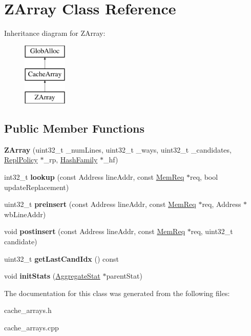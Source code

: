 \hypertarget{classZArray}{\section{Z\-Array Class Reference}
\label{classZArray}
}
Inheritance diagram for Z\-Array\-:\begin{figure}[H]
\begin{center}
\leavevmode
\includegraphics[height=3.000000cm]{classZArray}
\end{center}
\end{figure}
\subsection*{Public Member Functions}
\begin{DoxyCompactItemize}
\item 
\hypertarget{classZArray_afb8be1ac5cb0b39004e99ff723e26b50}{{\bfseries Z\-Array} (uint32\-\_\-t \-\_\-num\-Lines, uint32\-\_\-t \-\_\-ways, uint32\-\_\-t \-\_\-candidates, \hyperlink{classReplPolicy}{Repl\-Policy} $\ast$\-\_\-rp, \hyperlink{classHashFamily}{Hash\-Family} $\ast$\-\_\-hf)}\label{classZArray_afb8be1ac5cb0b39004e99ff723e26b50}

\item 
\hypertarget{classZArray_afbacb82458862d0eced5d9419f352815}{int32\-\_\-t {\bfseries lookup} (const Address line\-Addr, const \hyperlink{structMemReq}{Mem\-Req} $\ast$req, bool update\-Replacement)}\label{classZArray_afbacb82458862d0eced5d9419f352815}

\item 
\hypertarget{classZArray_ab6ac38b3f726386bf451d23e25cc0f92}{uint32\-\_\-t {\bfseries preinsert} (const Address line\-Addr, const \hyperlink{structMemReq}{Mem\-Req} $\ast$req, Address $\ast$wb\-Line\-Addr)}\label{classZArray_ab6ac38b3f726386bf451d23e25cc0f92}

\item 
\hypertarget{classZArray_a1a85633b823d1ca9626763d9b5411f4c}{void {\bfseries postinsert} (const Address line\-Addr, const \hyperlink{structMemReq}{Mem\-Req} $\ast$req, uint32\-\_\-t candidate)}\label{classZArray_a1a85633b823d1ca9626763d9b5411f4c}

\item 
\hypertarget{classZArray_a11b052fd25fe70479e9026f26886cdaf}{uint32\-\_\-t {\bfseries get\-Last\-Cand\-Idx} () const }\label{classZArray_a11b052fd25fe70479e9026f26886cdaf}

\item 
\hypertarget{classZArray_ab5adc62a1e1440d3517f3fe9c486915d}{void {\bfseries init\-Stats} (\hyperlink{classAggregateStat}{Aggregate\-Stat} $\ast$parent\-Stat)}\label{classZArray_ab5adc62a1e1440d3517f3fe9c486915d}

\end{DoxyCompactItemize}


The documentation for this class was generated from the following files\-:\begin{DoxyCompactItemize}
\item 
cache\-\_\-arrays.\-h\item 
cache\-\_\-arrays.\-cpp\end{DoxyCompactItemize}
